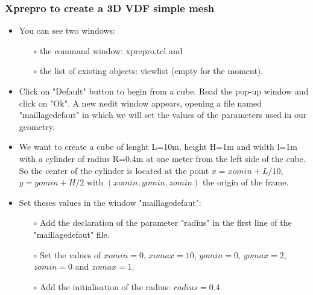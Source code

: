 \documentclass[10pt]{beamer}
\begin{document}
\begin{frame}
\frametitle{Xprepro to create a 3D VDF simple mesh}
\begin{block}{}

\begin{itemize}
\item You can see two windows: 
    \begin{itemize}
    \item [$\circ$] the command window: xprepro.tcl and 
    \item [$\circ$] the list of existing objects: viewlist (empty for the moment).
    \end{itemize}
\item Click on "Default" button to begin from a cube. Read the pop-up window and click on "Ok". A new nedit window appears, opening a file named "maillagedefaut" in which we will set the values of the parameters used in our geometry.
\item We want to create a cube of lenght L=10m, height H=1m and width l=1m with a cylinder of radius R=0.4m at one meter from the left side of the cube. So the center of the cylinder is located at the point $x=xomin+L/10$, $y=yomin+H/2$ with $(xomin, yomin, zomin)$ the origin of the frame.
\item Set theses values in the window "maillagedefaut":
\begin{itemize}
    \item [$\circ$] Add the declaration of the parameter "radius" in the first line of the "maillagedefaut" file.
    \item [$\circ$] Set the values of $xomin=0$, $xomax=10$, $yomin=0$, $yomax=2$, $zomin=0$ and $zomax=1$.
    \item [$\circ$] Add the initialisation of the radius: $radius=0.4$.
\end{itemize}
\end{itemize}

\end{block}
\end{frame}
\end{document}
